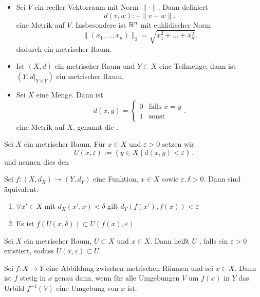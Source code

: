 \begin{example}
    \begin{itemize}
        \item 
    Sei $V$ ein reeller Vektorraum mit Norm  $\lVert \cdot  \rVert$. Dann definiert
    \[
        d(v,w) :- \lVert v-w \rVert 
    .\] 
    eine Metrik auf $V$. Insbesondere ist $\mathbb{R}^n$ mit euklidischer Norm
    \[
        \lVert (x_1,\ldots,x_n) \rVert _2 = \sqrt{x_1^2 + \ldots + x_{n}^2} 
    .\] 
    dadurch ein metrischer Raum.
\item Ist $(X,d)$ ein metrischer Raum und  $Y\subset X$ eine Teilmenge, dann ist $(Y, d| _{Y\times Y})$ ein metrischer Raum.
\item Sei $X$ eine Menge. Dann ist
    \[
        d(x,y) = \begin{cases}
            0 & \text{falls } x=y \\
            1 & \text{sonst}
        \end{cases}
    .\] 
    eine Metrik auf $X$, genannt die .
    \end{itemize}
\end{example}
\begin{notation}
    Sei $X$ ein metrischer Raum. Für  $x\in X$ und $ε>0$ setzen wir
     \[
         U(x,ε) := \left \{y\in X \mid  d(x,y) < ε\right\} 
    .\] 
    und nennen dies den 
\end{notation}
\begin{observe}
    Sei $f: (X,d_X) \to  (Y,d_Y)$ eine Funktion, $x\in X$ sowie $ε,δ>0$. Dann sind äquivalent:
\begin{enumerate}[1)]
    \item $\forall x' \in X$ mit $d_X(x',x) < δ$ gilt  $d_Y(f(x'),f(x)) < ε$
    \item Es ist $f(U(x,\delta)) \subset U(f(x),ε)$
    \end{enumerate}
\end{observe}
\begin{definition}
    Sei $X$ ein metrischer Raum,  $U\subset X$ und $x\in X$. Dann heißt $U$ , falls ein $ε>0$ existiert, sodass  $U(x,ε) \subset U$. 
\end{definition}
\begin{theorem}
    \label{thm:stetig_urbild_von_umgebung}
    Sei $f:X \to  Y$ eine Abbildung zwischen metrischen Räumen und sei $x\in X$. Dann ist $f$ stetig in  $x$ genau dann, wenn für alle Umgebungen  $V$ um  $f(x)$ in  $Y$ das Urbild  $f^{-1}(V)$ eine Umgebung von $x$ ist.
\end{theorem}

